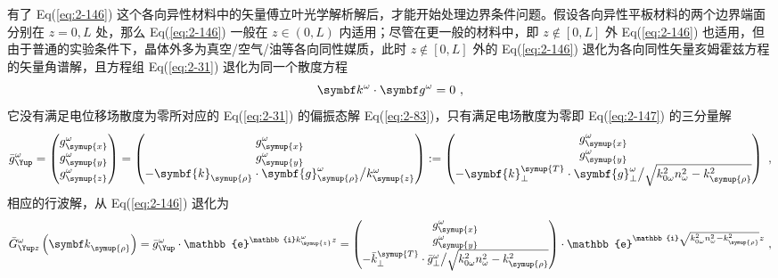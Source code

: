 有了 Eq(\ref{eq:2-146}) 这个各向异性材料中的矢量傅立叶光学解析解后，才能开始处理边界条件问题。假设各向异性平板材料的两个边界端面分别在 $z=0,L$ 处，那么 Eq(\ref{eq:2-146}) 一般在 $z \in \left( 0, L \right)$ 内适用；尽管在更一般的材料中，即 $z \notin \left[ 0, L \right]$ 外 Eq(\ref{eq:2-146}) 也适用，但由于普通的实验条件下，晶体外多为真空/空气/油等各向同性媒质，此时 $z \notin \left[ 0, L \right]$ 外的 Eq(\ref{eq:2-146}) 退化为各向同性矢量亥姆霍兹方程的矢量角谱解，且方程组 Eq(\ref{eq:2-31}) 退化为同一个散度方程
\begin{equation} \label{eq:2-147}
	\abovedisplayskip=10pt
	\belowdisplayskip=10pt
	\symbf k^{\omega} \cdot \symbf g^{\omega} = 0 ~,
\end{equation}
它没有满足电位移场散度为零所对应的 Eq(\ref{eq:2-31}) 的偏振态解 Eq(\ref{eq:2-83})，只有满足电场散度为零即 Eq(\ref{eq:2-147}) 的三分量解
\begin{equation} \label{eq:2-148}
	\bar{g}^{\omega}_{\Yup} = \begin{pmatrix} g^{\omega}_{\symup{x}} \\ g^{\omega}_{\symup{y}} \\ g^{\omega}_{\symup{z}} \end{pmatrix} = \begin{pmatrix} g^{\omega}_{\symup{x}} \\ g^{\omega}_{\symup{y}} \\ - \symbf{k}_{\symup{\rho}} \cdot \symbf{g}^{\omega}_{\symup{\rho}} \big/ k^{\omega}_{\symup{z}} \end{pmatrix} := \begin{pmatrix} g^{\omega}_{\symup{x}} \\ g^{\omega}_{\symup{y}} \\ - \symbf{k}^{\symup{T}}_{\perp} \cdot \symbf{g}^{\omega}_{\perp} \big/ \sqrt{ k^{2}_{0\omega} n^{2}_{\omega} - k^{2}_{\symup{\rho}} } \end{pmatrix} ~,
\end{equation}
相应的行波解，从 Eq(\ref{eq:2-146}) 退化为
\begin{equation} \label{eq:2-149}
	\bar{G}^{\omega}_{\Yup z} \left( {\symbf k}_{\symup{\rho}} \right) = \bar{g}^{\omega}_{\Yup} \cdot \mathbb{e}^{ \mathbb{i} k^\omega_{\symup{z}} z} = \begin{pmatrix} g^{\omega}_{\symup{x}} \\ g^{\omega}_{\symup{y}} \\ - \bar{k}^{\symup{T}}_{\perp} \cdot \bar{g}^{\omega}_{\perp} \big/ \sqrt{ k^{2}_{0\omega} n^{2}_{\omega} - k^{2}_{\symup{\rho}} } \end{pmatrix} \cdot \mathbb{e}^{ \mathbb{i} \sqrt{ k^{2}_{0\omega} n^{2}_{\omega} - k^{2}_{\symup{\rho}} } z} ~,
\end{equation}
